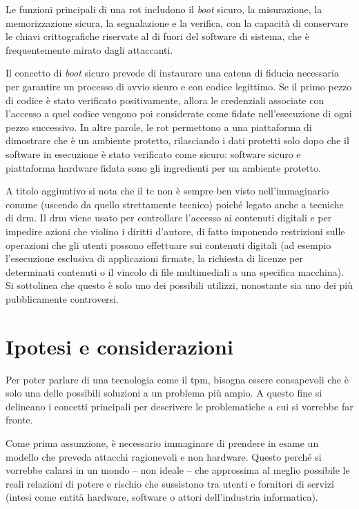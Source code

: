 Le funzioni principali di una \acrshort{rot} includono il \textit{boot} sicuro, la misurazione, la memorizzazione sicura, la segnalazione e la verifica, con la capacità di conservare le chiavi crittografiche riservate al di fuori del software di sistema, che è frequentemente mirato dagli attaccanti. 

Il concetto di \textit{boot} sicuro prevede di instaurare una catena di fiducia necessaria per garantire un processo di avvio sicuro e con codice legittimo. Se il primo pezzo di codice è stato verificato positivamente, allora le credenziali associate con l'accesso a quel codice vengono poi considerate come fidate nell'esecuzione di ogni pezzo successivo. In altre parole, le \acrshort{rot} permettono a una piattaforma di dimostrare che è un ambiente protetto, rilasciando i dati protetti solo dopo che il software in esecuzione è stato verificato come sicuro: software sicuro e piattaforma hardware fidata sono gli ingredienti per un ambiente protetto. 

A titolo aggiuntivo si nota che il \acrshort{tc} non è sempre ben visto nell'immaginario comune (uscendo da quello strettamente tecnico) poiché legato anche a tecniche di \acrfull{drm}. Il \acrshort{drm} viene usato per controllare l'accesso ai contenuti digitali e per impedire azioni che violino i diritti d'autore, di fatto imponendo restrizioni sulle operazioni che gli utenti possono effettuare sui contenuti digitali (ad esempio l'esecuzione esclusiva di applicazioni firmate, la richiesta di licenze per determinati contenuti o il vincolo di file multimediali a una specifica macchina). Si sottolinea che questo è solo uno dei possibili utilizzi, nonostante sia uno dei più pubblicamente controversi.


\section{Ipotesi e considerazioni}\label{sec:ipotesi_considerazioni}
Per poter parlare di una tecnologia come il \acrshort{tpm}, bisogna essere consapevoli che è solo una delle possibili soluzioni a un problema più ampio. A questo fine si delineano i concetti principali per descrivere le problematiche a cui si vorrebbe far fronte.

Come prima assunzione, è necessario immaginare di prendere in esame un modello che preveda attacchi ragionevoli e non hardware. Questo perché si vorrebbe calarsi in un mondo -- non ideale -- che approssima al meglio possibile le reali relazioni di potere e rischio che sussistono tra utenti e fornitori di servizi (intesi come entità hardware, software o attori dell'industria informatica).

